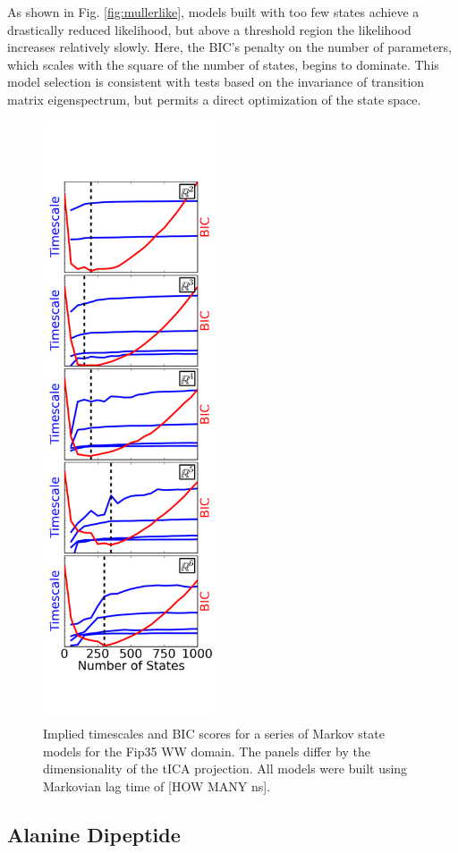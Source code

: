 \documentclass[twocolumn,floatfix,nofootinbib,aps]{revtex4-1}
\begin{document}
As shown in Fig. \ref{fig:mullerlike}, models built with too few states achieve a drastically reduced likelihood, but above a threshold region the likelihood increases relatively slowly. Here, the BIC's penalty on the number of parameters, which scales with the square of the number of states, begins to dominate. This model selection is consistent with tests based on the invariance of transition matrix eigenspectrum, but permits a direct optimization of the state space.

\begin{figure}
\centering
\includegraphics[width=2in]{figs/ww_bic_vs_eval_slide_nscounts.png}
\caption{Implied timescales and BIC scores for a series of Markov state models for the Fip35 WW domain. The panels differ by the dimensionality of the tICA projection. All models were built using Markovian lag time of [HOW MANY ns].}
\label{fig:ww}
\end{figure}

\subsection{Alanine Dipeptide}
\end{document}
